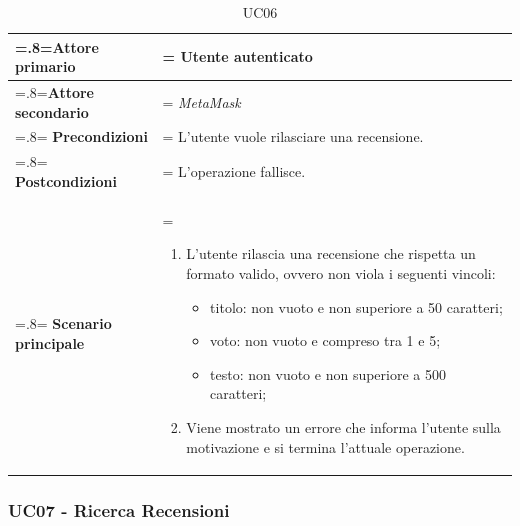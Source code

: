             \begin{table}[H]
                \centering
                \renewcommand{\arraystretch}{1.8}
                \renewcommand\tabularxcolumn[1]{m{#1}}
                \begin{tabularx}{0.9\textwidth} {
                    >{\hsize=.8\hsize\linewidth=\hsize}X
                    >{\hsize=1.2\hsize\linewidth=\hsize}X}
                    \hline
                    \textbf{Attore primario} & Utente autenticato \\
                    \hline
                    \textbf{Attore secondario} & \textit{MetaMask} \\
                    \hline
                    \textbf{Precondizioni} & L'utente vuole rilasciare una recensione. \\
                    \hline
                    \textbf{Postcondizioni} & L'operazione fallisce. \\
                    \hline
                    \textbf{Scenario principale} &
                        \begin{enumerate}
                            \item L'utente rilascia una recensione che rispetta un formato valido, ovvero non viola i seguenti vincoli:
                            \begin{itemize}
                                \item titolo: non vuoto e non superiore a 50 caratteri;
                                \item voto: non vuoto e compreso tra 1 e 5;
                                \item testo: non vuoto e non superiore a 500 caratteri;
                            \end{itemize}
                            \item Viene mostrato un errore che informa l'utente sulla motivazione e si termina l'attuale operazione.
                        \end{enumerate} \\
                    \hline
                \end{tabularx}
                \caption{UC06}
            \end{table}

        \subsubsection{UC07 - Ricerca Recensioni}
        \label{UC07}

